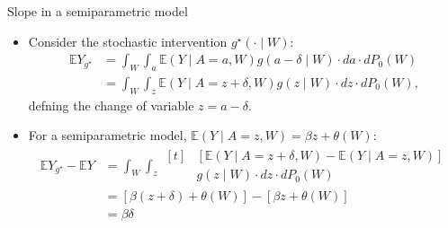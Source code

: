 \documentclass{beamer}
\newcommand{\E}{\mathbb{E}}
\begin{document}
\begin{frame}[c]{Slope in a semiparametric model}

\begin{center}
\begin{itemize}
  \itemsep10pt
  \item Consider the stochastic intervention $g^{\star}(\cdot \mid W)$:
    \begin{align*}
      \E Y_{g^{\star}} &= \int_W \int_a \E(Y \mid A = a, W) g(a - \delta
            \mid W) \cdot da \cdot dP_0(W) \\
        &= \int_W \int_z \E(Y \mid A = z + \delta, W) g(z \mid W) \cdot dz
          \cdot dP_0(W),
    \end{align*}
      defning the change of variable $z = a - \delta$.
  \item For a semiparametric model, $\E (Y \mid A = z, W) = \beta z +
    \theta(W)$:
    \begin{align*}
      \E Y_{g^{\star}} - \E Y &= \int_W \int_z
      \begin{aligned}[t]
        & [\E(Y \mid A = z + \delta, W) - \E(Y \mid A = z, W)] \\
        & g(z \mid W) \cdot dz \cdot dP_0(W)
      \end{aligned} \\
      &= [\beta (z + \delta) + \theta(W)] - [\beta z + \theta(W)] \\
      &= \beta \delta
    \end{align*}
\end{itemize}
\end{center}

\note{
}

\end{frame}


\setbeamercovered{}
\beamerdefaultoverlayspecification{}

\begin{frame}[c,allowframebreaks]{}

\small

\nocite{*}


\end{frame}

\end{document}
